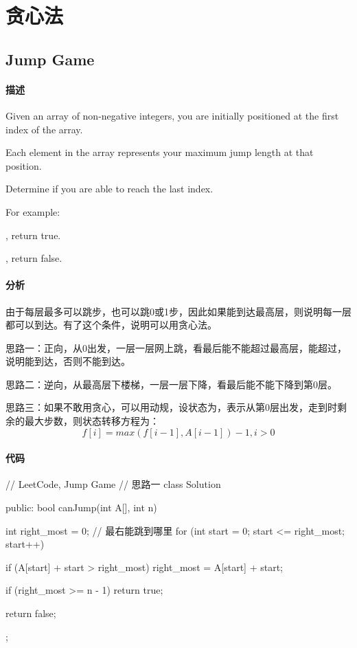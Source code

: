 \chapter{贪心法}


\section{Jump Game} %
\label{sec:jump-game}


\subsubsection{描述}
Given an array of non-negative integers, you are initially positioned at the first index of the array.

Each element in the array represents your maximum jump length at that position.

Determine if you are able to reach the last index.

For example:

, return true.

, return false.


\subsubsection{分析}
由于每层最多可以跳步，也可以跳0或1步，因此如果能到达最高层，则说明每一层都可以到达。有了这个条件，说明可以用贪心法。

思路一：正向，从0出发，一层一层网上跳，看最后能不能超过最高层，能超过，说明能到达，否则不能到达。

思路二：逆向，从最高层下楼梯，一层一层下降，看最后能不能下降到第0层。

思路三：如果不敢用贪心，可以用动规，设状态为，表示从第0层出发，走到时剩余的最大步数，则状态转移方程为：
$$
f[i] = max(f[i-1], A[i-1])-1, i > 0
$$

\subsubsection{代码}
\begin{Code}
// LeetCode, Jump Game
// 思路一
class Solution {
public:
    bool canJump(int A[], int n) {
        int right_most = 0; // 最右能跳到哪里
        for (int start = 0; start <= right_most; start++) {
            if (A[start] + start > right_most)
                right_most = A[start] + start;

            if (right_most >= n - 1) return true;
        }
        return false;
    }
};
\end{Code}

